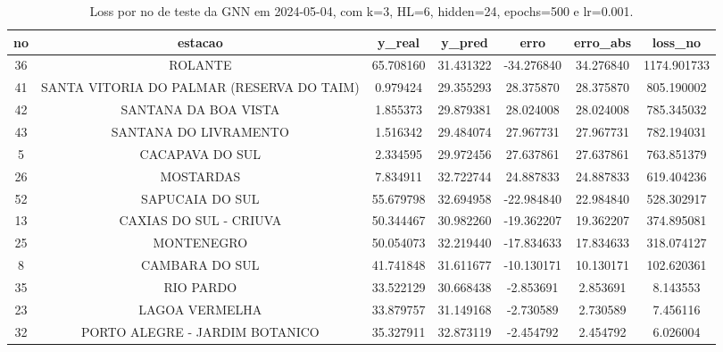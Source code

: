\begin{table}[h]
\centering
\caption{Loss por no de teste da GNN em 2024-05-04, com k=3, HL=6, hidden=24, epochs=500 e lr=0.001.}
\label{tab:gnn_loss_k3_hl6_h24_e500_d20240504}
\begin{tabular}{ccccccc}
\toprule
no & estacao & y\_real & y\_pred & erro & erro\_abs & loss\_no \\
\midrule
36 & ROLANTE & 65.708160 & 31.431322 & -34.276840 & 34.276840 & 1174.901733 \\
41 & SANTA VITORIA DO PALMAR (RESERVA DO TAIM) & 0.979424 & 29.355293 & 28.375870 & 28.375870 & 805.190002 \\
42 & SANTANA DA BOA VISTA & 1.855373 & 29.879381 & 28.024008 & 28.024008 & 785.345032 \\
43 & SANTANA DO LIVRAMENTO & 1.516342 & 29.484074 & 27.967731 & 27.967731 & 782.194031 \\
5 & CACAPAVA DO SUL & 2.334595 & 29.972456 & 27.637861 & 27.637861 & 763.851379 \\
26 & MOSTARDAS & 7.834911 & 32.722744 & 24.887833 & 24.887833 & 619.404236 \\
52 & SAPUCAIA DO SUL & 55.679798 & 32.694958 & -22.984840 & 22.984840 & 528.302917 \\
13 & CAXIAS DO SUL - CRIUVA & 50.344467 & 30.982260 & -19.362207 & 19.362207 & 374.895081 \\
25 & MONTENEGRO & 50.054073 & 32.219440 & -17.834633 & 17.834633 & 318.074127 \\
8 & CAMBARA DO SUL & 41.741848 & 31.611677 & -10.130171 & 10.130171 & 102.620361 \\
35 & RIO PARDO & 33.522129 & 30.668438 & -2.853691 & 2.853691 & 8.143553 \\
23 & LAGOA VERMELHA & 33.879757 & 31.149168 & -2.730589 & 2.730589 & 7.456116 \\
32 & PORTO ALEGRE - JARDIM BOTANICO & 35.327911 & 32.873119 & -2.454792 & 2.454792 & 6.026004 \\
\bottomrule
\end{tabular}
\end{table}

